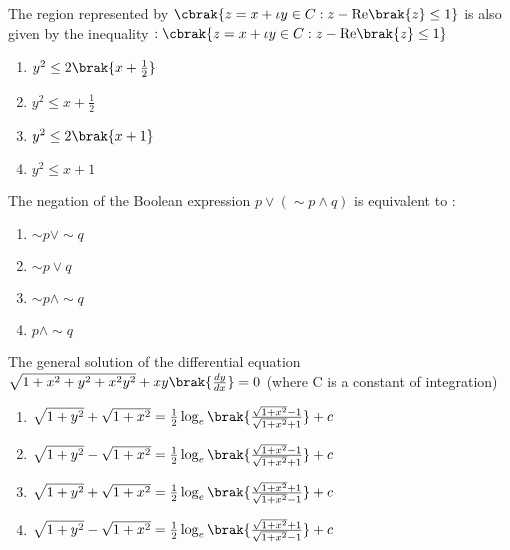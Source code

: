 \iffalse
	\title{Assignment}
	\author{EE24BTECH11015}
	\section{mcq-single}
\fi

	\item The region represented by $\cbrak{ z = x+ \iota y  \in C : z - \text{Re} \brak{z} \leq 1}$ is also given by the inequality $: \cbrak{z = x + \iota y \in C : z -\text{Re} \brak{z} \leq 1}$ \hfill{}
\begin{multicols}{4}
\begin{enumerate}
\item $y^2 \leq 2\brak{x + \frac{1}{2}}$
\item $y^2 \leq x + \frac{1}{2}$
\item $y^2 \leq 2\brak{x + 1}$
\item $y^2 \leq x + 1$
\end{enumerate}
\end{multicols}

\item  The negation of the Boolean expression $p \lor (\sim p \land q)$ is equivalent to :

\hfill{}

\begin{multicols}{4}
\begin{enumerate}
\item $\sim p \lor  \sim q$
\item $\sim p \lor q$
\item $\sim p \land \sim q$
\item $p \land \sim q$
\end{enumerate}
\end{multicols}

\item  The general solution of the differential equation $\sqrt{1+x^2+y^2+x^2y^2}+xy\brak{\frac{dy}{dx}} = 0$ (where C is a constant of integration)\hfill{}

\begin{enumerate}
\item $\sqrt{1 + y^2} + \sqrt{1 + x^2} = \frac{1}{2} \log_e \brak{ \frac{\sqrt{1 + x^2} - 1}{\sqrt{1 + x^2} + 1} } + c $
\item $\sqrt{1 + y^2} - \sqrt{1 + x^2} = \frac{1}{2} \log_e \brak{ \frac{\sqrt{1 + x^2} - 1}{\sqrt{1 + x^2} + 1} } + c $
\item $\sqrt{1 + y^2} + \sqrt{1 + x^2} = \frac{1}{2} \log_e \brak{ \frac{\sqrt{1 + x^2} + 1}{\sqrt{1 + x^2} - 1} } + c $
\item $\sqrt{1 + y^2} - \sqrt{1 + x^2} = \frac{1}{2} \log_e \brak{ \frac{\sqrt{1 + x^2} + 1}{\sqrt{1 + x^2} - 1} } + c $
\end{enumerate}


